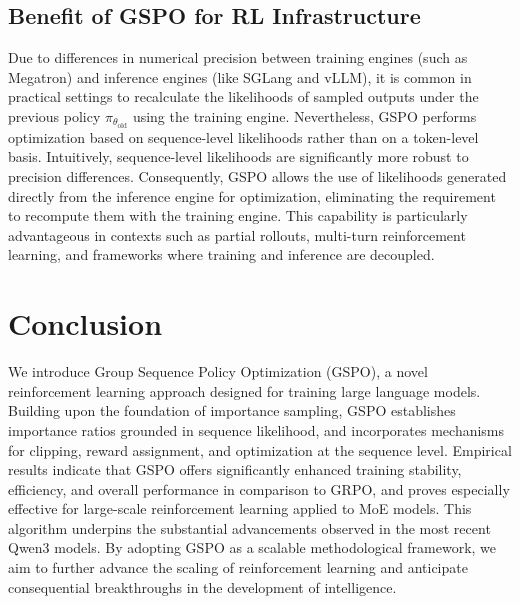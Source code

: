 \subsection{Benefit of GSPO for RL Infrastructure}

Due to differences in numerical precision between training engines (such as Megatron) and inference engines (like SGLang and vLLM), it is common in practical settings to recalculate the likelihoods of sampled outputs under the previous policy $\pi_{\theta_\text{old}}$ using the training engine. Nevertheless, GSPO performs optimization based on sequence-level likelihoods rather than on a token-level basis. Intuitively, sequence-level likelihoods are significantly more robust to precision differences. Consequently, GSPO allows the use of likelihoods generated directly from the inference engine for optimization, eliminating the requirement to recompute them with the training engine. This capability is particularly advantageous in contexts such as partial rollouts, multi-turn reinforcement learning, and frameworks where training and inference are decoupled.

\section{Conclusion}

We introduce Group Sequence Policy Optimization (GSPO), a novel reinforcement learning approach designed for training large language models. Building upon the foundation of importance sampling, GSPO establishes importance ratios grounded in sequence likelihood, and incorporates mechanisms for clipping, reward assignment, and optimization at the sequence level. Empirical results indicate that GSPO offers significantly enhanced training stability, efficiency, and overall performance in comparison to GRPO, and proves especially effective for large-scale reinforcement learning applied to MoE models. This algorithm underpins the substantial advancements observed in the most recent Qwen3 models. By adopting GSPO as a scalable methodological framework, we aim to further advance the scaling of reinforcement learning and anticipate consequential breakthroughs in the development of intelligence.

